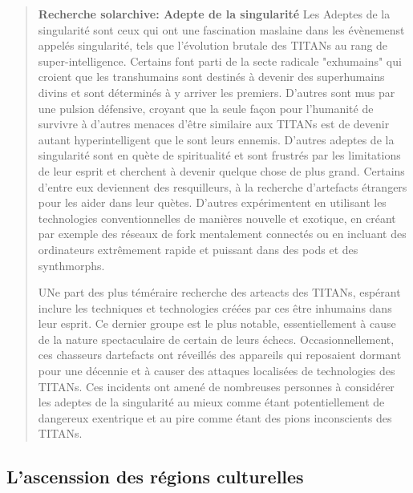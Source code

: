    \begin{quotation} \textbf{Recherche solarchive: Adepte de la singularité } Les Adeptes de la singularité sont ceux qui ont une fascination maslaine dans les évènemenst appelés singularité, tels que l'évolution brutale des TITANs au rang de super-intelligence. Certains font parti de la secte radicale  "exhumains" qui croient que les transhumains sont destinés à devenir des superhumains divins et sont déterminés à y arriver les premiers. D'autres sont mus par une pulsion défensive, croyant que la seule façon pour l'humanité de survivre à d'autres menaces  d'être similaire aux TITANs est de devenir autant hyperintelligent que le sont leurs ennemis. D'autres adeptes de la singularité sont en quète de spiritualité et sont frustrés par les limitations de leur esprit et cherchent à devenir quelque chose de plus grand. Certains d'entre eux deviennent des resquilleurs, à la recherche d'artefacts étrangers pour les aider dans leur quètes. D'autres expérimentent en utilisant les technologies conventionnelles de manières nouvelle et exotique, en créant par exemple des réseaux de fork mentalement connectés ou en incluant des ordinateurs extrêmement rapide et puissant dans des pods et des synthmorphs. 

      UNe part des plus téméraire recherche des arteacts des TITANs, espérant inclure les techniques et technologies créées par ces être inhumains dans leur esprit. Ce dernier groupe est le plus notable, essentiellement à cause de la nature spectaculaire de certain de leurs échecs. Occasionnellement, ces chasseurs dartefacts ont réveillés des appareils qui reposaient dormant pour une décennie et à causer des attaques localisées de technologies des TITANs. Ces incidents ont amené de nombreuses personnes à considérer les adeptes de la singularité au mieux comme étant potentiellement de dangereux exentrique et au pire comme étant des pions inconscients des TITANs. \end{quotation} 

      \subsection{L'ascenssion des régions culturelles} \label{sec:rise-cult-regi} 

